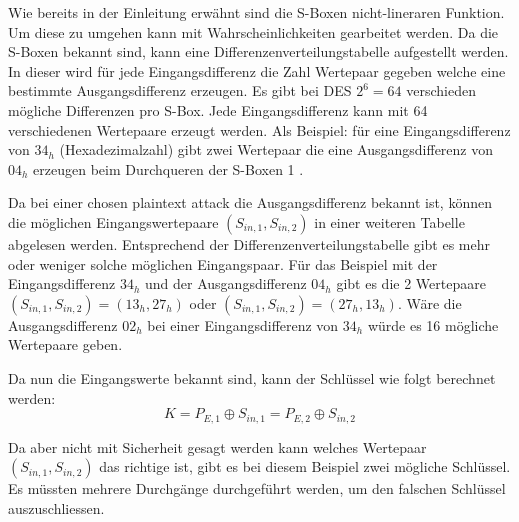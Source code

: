 Wie bereits in der Einleitung erwähnt sind die S-Boxen nicht-lineraren Funktion. Um diese zu umgehen kann mit Wahrscheinlichkeiten gearbeitet werden.
Da die S-Boxen bekannt sind, kann eine Differenzenverteilungstabelle aufgestellt werden. In dieser wird für jede Eingangsdifferenz die Zahl Wertepaar gegeben welche eine bestimmte Ausgangsdifferenz erzeugen. Es gibt bei DES $2^{6} = 64$ verschieden mögliche Differenzen pro S-Box. Jede Eingangsdifferenz kann mit 64 verschiedenen Wertepaare erzeugt werden. Als Beispiel: für eine Eingangsdifferenz von $34_{h}$ (Hexadezimalzahl) gibt zwei Wertepaar die eine Ausgangsdifferenz von $04_{h}$ erzeugen beim Durchqueren der S-Boxen 1 . 

Da bei einer chosen plaintext attack die Ausgangsdifferenz bekannt ist, können die möglichen Eingangswertepaare $(S_{in,1}, S_{in,2})$ in einer weiteren Tabelle abgelesen werden. Entsprechend der Differenzenverteilungstabelle gibt es mehr oder weniger solche möglichen Eingangspaar.
Für das Beispiel mit der Eingangsdifferenz $34_{h}$ und der Ausgangsdifferenz $04_{h}$ gibt es die 2 Wertepaare $(S_{in,1}, S_{in,2}) = (13_{h}, 27_{h})$ oder $(S_{in,1},S_{in,2}) = (27_{h}, 13_{h})$. Wäre die Ausgangsdifferenz $02_{h}$ bei einer Eingangsdifferenz von $34_{h}$ würde es 16 mögliche Wertepaare geben. 

Da nun die Eingangswerte bekannt sind, kann der Schlüssel wie folgt berechnet werden:
\begin{equation}\label{equ:Schluessel_Loesung}
K = P_{E,1} \oplus S_{in,1} = P_{E,2} \oplus S_{in,2}
\end{equation}

Da aber nicht mit Sicherheit gesagt werden kann welches Wertepaar $(S_{in,1}, S_{in,2})$ das richtige ist, gibt es bei diesem Beispiel zwei mögliche Schlüssel. Es müssten mehrere Durchgänge durchgeführt werden, um den falschen Schlüssel auszuschliessen. 














